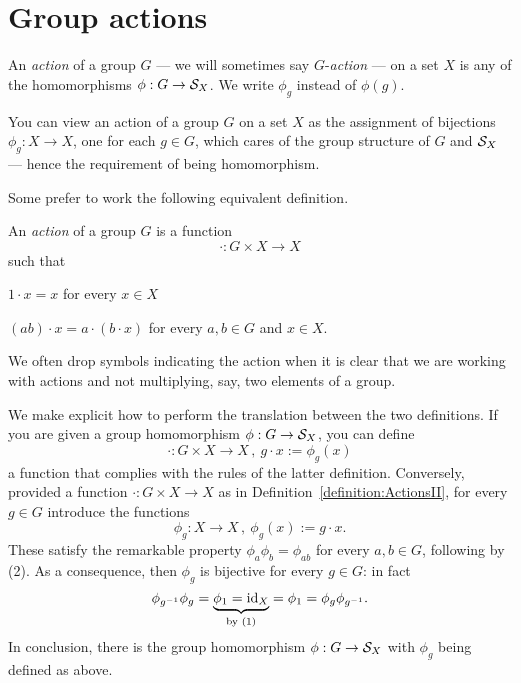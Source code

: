 
\section{Group actions}

\begin{definition}\label{definition:ActionsI}
An {\em action} of a group \(G\) --- we will sometimes say \(G\)-{\em action} --- on a set \(X\) is any of the homomorphisms \(\phi : G \to \mathcal S_X\). We write \(\phi_g\) instead of \(\phi(g)\).
\end{definition}

You can view an action of a group \(G\) on a set \(X\) as the assignment of bijections \(\phi_g : X \to X\), one for each \(g \in G\), which cares of the group structure of \(G\) and \(\mathcal S_X\) --- hence the requirement of being homomorphism.

Some prefer to work the following equivalent definition.

\begin{definition}\label{definition:ActionsII}
An {\em action} of a group \(G\) is a function
\[\cdot : G \times X \to X\]
such that
\begin{tcbenum}
\item \(1 \cdot x = x\) for every \(x \in X\)
\item \((ab) \cdot x = a \cdot (b \cdot x)\) for every \(a, b \in G\) and \(x \in X\).
\end{tcbenum}
We often drop symbols indicating the action when it is clear that we are working with actions and not multiplying, say, two elements of a group.
\end{definition}

We make explicit how to perform the translation between the two definitions. If you are given a group homomorphism \(\phi : G \to \mathcal S_X\), you can define
\[\cdot : G \times X \to X\,, \ g \cdot x := \phi_g(x)\]
a function that complies with the rules of the latter definition. Conversely, provided a function \(\cdot : G \times X \to X\) as in Definition~\ref{definition:ActionsII}, for every \(g \in G\) introduce the functions
\[\phi_g : X \to X\,, \ \phi_g (x) := g \cdot x .\]
These satisfy the remarkable property \(\phi_a\phi_b = \phi_{ab}\) for every \(a, b \in G\), following by (2). As a consequence, then \(\phi_g\) is bijective for every \(g \in G\): in fact
\[\phi_{g^{-1}} \phi_g = \underbrace{\phi_1 = \text{id}_X}_{\text{by (1)}} = \phi_1 = \phi_g \phi_{g^{-1}} .\]
In conclusion, there is the group homomorphism \(\phi : G \to \mathcal S_X\) with \(\phi_g\) being defined as above.


